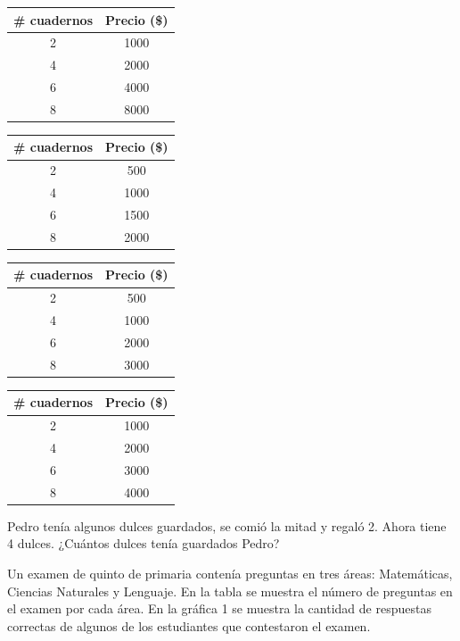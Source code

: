 \documentclass[10pt,addpoints]{exam}
\begin{document}
\begin{multicols}{2}
\begin{questions}
\begin{choices}
\choice \begin{tabular}{|c|c|}
\hline 
\# cuadernos & Precio (\$) \\ 
\hline 
2 & 1000 \\ 
\hline 
4 & 2000 \\ 
\hline 
6 & 4000 \\ 
\hline 
8 & 8000 \\ 
\hline 
\end{tabular}
\choice \begin{tabular}{|c|c|}
\hline 
\# cuadernos & Precio (\$) \\ 
\hline 
2 & 500 \\ 
\hline 
4 & 1000 \\ 
\hline 
6 & 1500 \\ 
\hline 
8 & 2000 \\ 
\hline 
\end{tabular} 
\choice \begin{tabular}{|c|c|}
\hline 
\# cuadernos & Precio (\$) \\ 
\hline 
2 & 500 \\ 
\hline 
4 & 1000 \\ 
\hline 
6 & 2000 \\ 
\hline 
8 & 3000 \\ 
\hline 
\end{tabular} 
\CorrectChoice \begin{tabular}{|c|c|}
\hline 
\# cuadernos & Precio (\$) \\ 
\hline 
2 & 1000 \\ 
\hline 
4 & 2000 \\ 
\hline 
6 & 3000 \\ 
\hline 
8 & 4000 \\ 
\hline 
\end{tabular} 
\end{choices}
\question Pedro tenía algunos dulces guardados, se comió la mitad y regaló 2. Ahora tiene 4 dulces. ¿Cuántos dulces tenía guardados Pedro?

\begin{oneparchoices}
\end{oneparchoices}
\question Un examen de quinto de primaria contenía preguntas en tres áreas: Matemáticas, Ciencias Naturales y Lenguaje. En la tabla se muestra el número de preguntas en el examen por cada área. En la gráfica 1 se muestra la cantidad de respuestas correctas de algunos de los estudiantes que contestaron el examen.


\end{questions}
\end{multicols}
\end{document}
